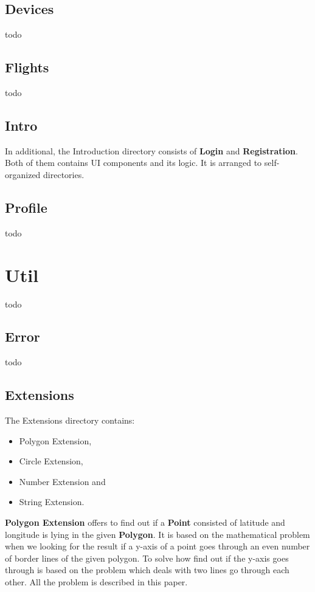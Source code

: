\subsection{Devices}\label{subsec:devices}
todo

\subsection{Flights}\label{subsec:flights}
todo

\subsection{Intro}\label{subsec:intro}
In additional, the Introduction directory consists of \textbf{Login} and \textbf{Registration}.
Both of them contains UI components and its logic.
It is arranged to self-organized directories.

\subsection{Profile}\label{subsec:profile}
todo

\section{Util}\label{sec:util}
todo

\subsection{Error}\label{subsec:error}
todo

\subsection{Extensions}\label{subsec:extensions}
The Extensions directory contains:
\begin{itemize}
    \item Polygon Extension,
    \item Circle Extension,
    \item Number Extension and
    \item String Extension.
\end{itemize}
\textbf{Polygon Extension} offers to find out if a \textbf{Point}\cite{} consisted of latitude and longitude is lying in the given \textbf{Polygon}\cite{}.
It is based on the mathematical problem when we looking for the result if a y-axis of a point goes through an even number of border lines of the given polygon.
To solve how find out if the y-axis goes through is based on the problem which deals with two lines go through each other.
All the problem is described in this paper\cite{}.

